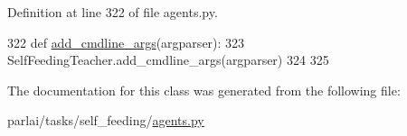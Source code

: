 Definition at line 322 of file agents.\+py.


\begin{DoxyCode}
322     \textcolor{keyword}{def }\hyperlink{namespaceparlai_1_1agents_1_1drqa_1_1config_a62fdd5554f1da6be0cba185271058320}{add\_cmdline\_args}(argparser):
323         SelfFeedingTeacher.add\_cmdline\_args(argparser)
324 
325 
\end{DoxyCode}


The documentation for this class was generated from the following file\+:\begin{DoxyCompactItemize}
\item 
parlai/tasks/self\+\_\+feeding/\hyperlink{parlai_2tasks_2self__feeding_2agents_8py}{agents.\+py}\end{DoxyCompactItemize}
